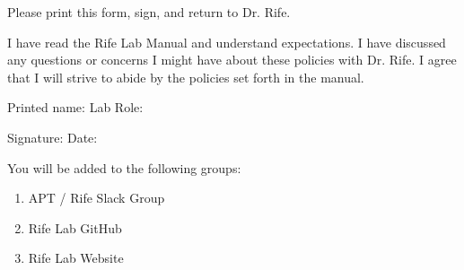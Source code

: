 \documentclass[letterpaper,12pt]{article}
\begin{document}
\noindent Please print this form, sign, and return to Dr. Rife.

\vspace{1em}

\noindent I have read the Rife Lab Manual and understand expectations. I have discussed any questions or concerns I might have about these policies with Dr. Rife. I agree that I will strive to abide by the policies set forth in the manual.

\vspace{2em}

\noindent Printed name: \underline{\hspace{6cm}} \quad Lab Role: \underline{\hspace{4cm}}

\vspace{2em}

\noindent Signature: \underline{\hspace{6cm}} \quad Date: \underline{\hspace{2cm}}

\vspace{2em}

\noindent You will be added to the following groups:
\begin{enumerate}
  \item APT / Rife Slack Group
  \item Rife Lab GitHub
  \item Rife Lab Website
  \end{enumerate}
\end{document}
